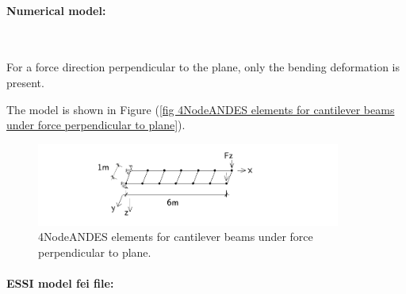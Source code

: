 \paragraph{Numerical model:} ~

\vskip 12pt

For a force  direction  perpendicular  to  the  plane, only the bending
deformation is present.


The  model is shown  in Figure (\ref{fig 4NodeANDES elements for
cantilever beams under force perpendicular to plane}).

\begin{figure}[!htb]
  \centering
    \centering
    \includegraphics[width=10cm]{./Figure-files/_Chapter_Appendix_Illustrative_Examples/beam_ANDES_xy_bending_6div.pdf}
  \caption{4NodeANDES elements for cantilever beams under force perpendicular to
  plane.}
  \label{fig 4NodeANDES elements for cantilever beams under force perpendicular to plane}
\end{figure}


\paragraph{ESSI model fei file: } ~

